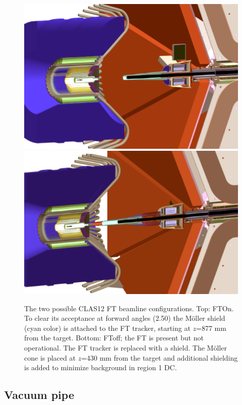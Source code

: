 \begin{figure}
	\centering
	\includegraphics[width=0.99\columnwidth,keepaspectratio]{img/ftOnGeometry.png}
	\includegraphics[width=0.99\columnwidth,keepaspectratio]{img/ftOffGeometry.png}
	\caption{The two possible CLAS12 FT beamline configurations. Top: FTOn. To clear its acceptance at forward angles (2.50\mdeg)
             the M\"oller shield (cyan color) is attached to the FT tracker, starting at $z$=877 mm from the target.
             Bottom: FToff; the FT is present but not operational. The FT tracker is replaced with a shield.
             The M\"oller cone is placed at $z$=430 mm from the target and additional shielding
             is added to minimize background in region 1 DC.}
	\label{fig:beamlineGeometry}
\end{figure}

\subsection{Vacuum pipe}

